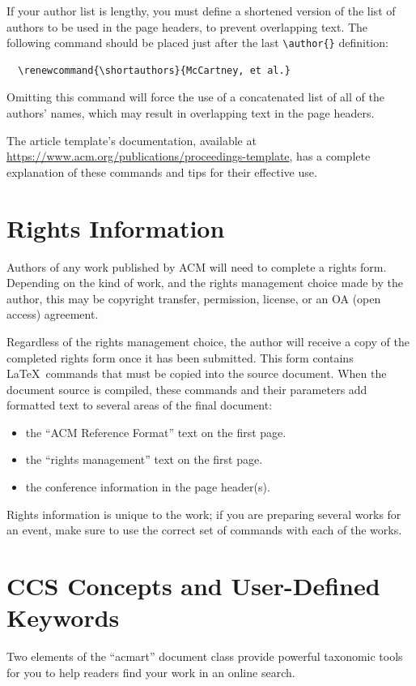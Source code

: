 \documentclass[sigplan,screen,anonymous]{acmart}
\begin{document}
If your author list is lengthy, you must define a shortened version of the list of authors to be used in the page headers, to prevent overlapping text. The following command should be placed just after the last \verb|\author{}| definition:
\begin{verbatim}
  \renewcommand{\shortauthors}{McCartney, et al.}
\end{verbatim}
Omitting this command will force the use of a concatenated list of all of the authors' names, which may result in overlapping text in the page headers.

The article template's documentation, available at  \url{https://www.acm.org/publications/proceedings-template}, has a complete explanation of these commands and tips for their effective use.

\section{Rights Information}

Authors of any work published by ACM will need to complete a rights form. Depending on the kind of work, and the rights management choice made by the author, this may be copyright transfer, permission, license, or an OA (open access) agreement.

Regardless of the rights management choice, the author will receive a copy of the completed rights form once it has been submitted. This form contains \LaTeX\ commands that must be copied into the source document. When the document source is compiled, these commands and their parameters add formatted text to several areas of the final document:
\begin{itemize}
\item the ``ACM Reference Format'' text on the first page.
\item the ``rights management'' text on the first page.
\item the conference information in the page header(s).
\end{itemize}

Rights information is unique to the work; if you are preparing several works for an event, make sure to use the correct set of commands with each of the works.

\section{CCS Concepts and User-Defined Keywords}

Two elements of the ``acmart'' document class provide powerful taxonomic tools for you to help readers find your work in an online search.
\end{document}
